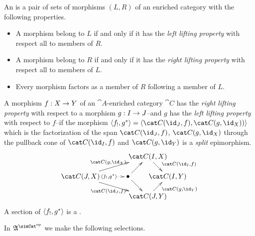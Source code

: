 \documentclass[csh.tex]{subfiles}
\begin{document}
\begin{definition}
An  is a pair of sets of morphisms $(L,R)$ of an enriched category with the following properties.
\begin{itemize}
\item A morphism belong to $L$ if and only if it has the \emph{left lifting property} with respect all to members of $R$.
\item A morphism belong to $R$ if and only if it has the \emph{right lifting property} with respect all to members of $L$.
\item Every morphism factors as a member of $R$ following a member of $L$.
\end{itemize}

A morphism $f: X\to Y$ of an $\cat A$-enriched category $\cat C$ has the \emph{right lifting property} with respect to a morphism $g: I\to J$--and $g$ has the \emph{left lifting property} with respect to $f$--if the morphism $\tuplet{f_!,g\ri} = \tuplet{\cat C(\id_J,f),\cat C(g,\id_X))}$ which is the factorization of the span $\cat C(\id_J,f)$, $\cat C(g,\id_X)$ through the pullback cone of $\cat C(\id_I,f)$ and $\cat C(g,\id_Y)$ is a \emph{split} epimorphism.
\[\xy
(34,20)*+{\cat C(I,X)}="top",(0,10)*+{\cat C(J,X)}="left",(24,10)*+{\bullet}="middle",(44,10)*+{\cat C(I,Y)}="right",(34,0)*+{\cat C(J,Y)}="bottom"
\ar^{\cat C(g,\id_X)} "left";"top" \ar@{.>}|(.6){\tuplet{f_!,g\ri}} "left";"middle" \ar_{\cat C(\id_J,f)} "left";"bottom" \ar "middle";"bottom"
\ar "middle";"top" \ar^(.6){\cat C(\id_I,f)} "top";"right" \ar_(.6){\cat C(g,\id_Y)} "bottom";"right"
\endxy\]
A section of $\left\langle f_!,g^* \right\rangle$ is a .
\end{definition}

In $\ambient\s$ we make the following selections. 
\end{document}
